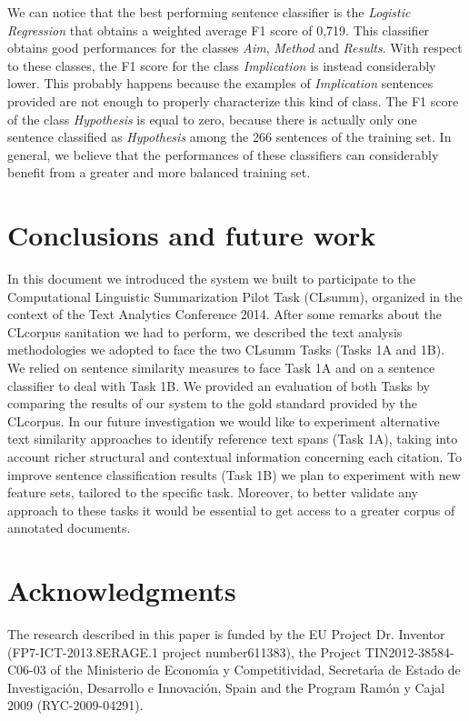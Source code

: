 \documentclass[11pt]{article}
\begin{document}
We can notice that the best performing sentence classifier is the \textit{Logistic Regression} that obtains a weighted average F1 score of 0,719. This classifier obtains good performances for the classes \textit{Aim}, \textit{Method} and \textit{Results}. With respect to these classes, the F1 score for the class \textit{Implication} is instead considerably lower. This probably happens because the examples of \textit{Implication} sentences provided are not enough to properly characterize this kind of class. The F1 score of the class \textit{Hypothesis} is equal to zero, because there is actually only one sentence classified as \textit{Hypothesis} among the 266 sentences of the training set. In general, we believe that the performances of these classifiers can considerably benefit from a greater and more balanced training set.

\section{Conclusions and future work}
\label{sec:conclusion}
In this document we introduced the system we built to participate to the Computational Linguistic Summarization Pilot Task (CLsumm), organized in the context of the Text Analytics Conference 2014. After some remarks about the CLcorpus sanitation we had to perform, we described the text analysis methodologies we adopted to face the two CLsumm Tasks (Tasks 1A and 1B). We relied on sentence similarity measures to face Task 1A and on a sentence classifier to deal with Task 1B. We provided an evaluation of both Tasks by comparing the results of our system to the gold standard provided by the CLcorpus.
In our future investigation we would like to experiment alternative text similarity approaches to identify reference text spans (Task 1A), taking into account richer structural and contextual information concerning each citation. To improve sentence classification results (Task 1B) we plan to experiment with new feature sets, tailored to the specific task. Moreover, to better validate any approach to these tasks it would be essential to get access to a greater corpus of annotated documents.


\section*{Acknowledgments}
The research described in this paper is funded by the EU Project Dr. Inventor (FP7-ICT-2013.8ERAGE.1 project number611383), the Project TIN2012-38584-C06-03 of the Ministerio de Econom\'{\i}a y Competitividad, Secretar\'{\i}a de Estado de Investigaci\'on, Desarrollo e Innovaci\'on, Spain and the Program Ram\'on y Cajal 2009 (RYC-2009-04291).
\end{document}
